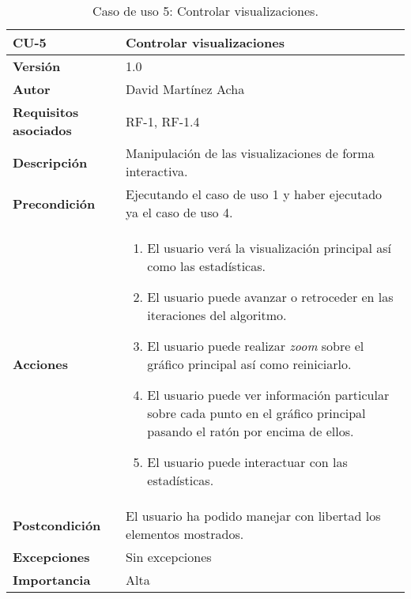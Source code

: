 \begin{table}[p]
	\centering
	\begin{tabularx}{\linewidth}{ p{} p{} }
		\toprule
		\textbf{CU-5}    & \textbf{Controlar visualizaciones}\\
		\toprule
		\textbf{Versión}              & 1.0    \\
		\textbf{Autor}                & David Martínez Acha \\
		\textbf{Requisitos asociados} & RF-1, RF-1.4 \\
		\textbf{Descripción}          & Manipulación de las visualizaciones de forma interactiva. \\
		\textbf{Precondición}         & Ejecutando el caso de uso 1 y haber ejecutado ya el caso de uso 4. \\
		\textbf{Acciones}             &
		\begin{enumerate}
			\def\labelenumi{\arabic{enumi}.}
			\tightlist
			\item El usuario verá la visualización principal así como las estadísticas.
			\item El usuario puede avanzar o retroceder en las iteraciones del algoritmo.
			\item El usuario puede realizar \textit{zoom} sobre el gráfico principal así como reiniciarlo.
			\item El usuario puede ver información particular sobre cada punto en el gráfico principal pasando el ratón por encima de ellos.
			\item El usuario puede interactuar con las estadísticas.
		\end{enumerate}\\
		\textbf{Postcondición}        & El usuario ha podido manejar con libertad los elementos mostrados. \\
		\textbf{Excepciones}          & Sin excepciones \\
		\textbf{Importancia}          & Alta \\
		\bottomrule
	\end{tabularx}
	\caption{Caso de uso 5: Controlar visualizaciones.}
\end{table}


